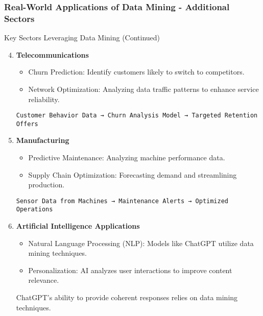 \documentclass[aspectratio=169]{beamer}
\begin{document}
\begin{frame}[fragile]
    \frametitle{Real-World Applications of Data Mining - Additional Sectors}
    \begin{block}{Key Sectors Leveraging Data Mining (Continued)}
        \begin{enumerate}\setcounter{enumi}{3}
            \item \textbf{Telecommunications}
                \begin{itemize}
                    \item Churn Prediction: Identify customers likely to switch to competitors.
                    \item Network Optimization: Analyzing data traffic patterns to enhance service reliability.
                \end{itemize}
                \begin{example}
                    \texttt{Customer Behavior Data → Churn Analysis Model → Targeted Retention Offers}
                \end{example}

            \item \textbf{Manufacturing}
                \begin{itemize}
                    \item Predictive Maintenance: Analyzing machine performance data.
                    \item Supply Chain Optimization: Forecasting demand and streamlining production.
                \end{itemize}
                \begin{example}
                    \texttt{Sensor Data from Machines → Maintenance Alerts → Optimized Operations}
                \end{example}

            \item \textbf{Artificial Intelligence Applications}
                \begin{itemize}
                    \item Natural Language Processing (NLP): Models like ChatGPT utilize data mining techniques.
                    \item Personalization: AI analyzes user interactions to improve content relevance.
                \end{itemize}
                \begin{example}
                    ChatGPT’s ability to provide coherent responses relies on data mining techniques.
                \end{example}
        \end{enumerate}
    \end{block}
\end{frame}
\end{document}
